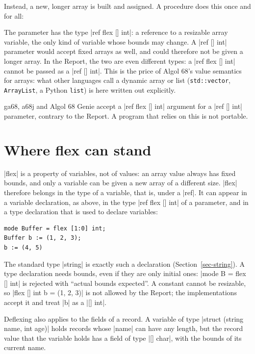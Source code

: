 
Instead, a new, longer array is built and assigned. A procedure does this
once and for all:


The parameter has the type \code|ref flex [] int|: a reference to a
resizable array variable, the only kind of variable whose bounds may
change. A \code|ref [] int| parameter would accept fixed arrays as well,
and could therefore not be given a longer array. In the Report, the two
are even different types: a \code|ref flex [] int| cannot be passed as a
\code|ref [] int|. This is the price of Algol 68's value semantics for
arrays: what other languages call a dynamic array or list
(\texttt{std::vector}, \texttt{ArrayList}, a Python \texttt{list}) is
here written out explicitly.

\begin{implnote}
ga68, a68j and Algol 68 Genie accept a \code|ref flex [] int| argument for
a \code|ref [] int| parameter, contrary to the Report. A program that
relies on this is not portable.
\end{implnote}

\section{Where \textbf{flex} can stand}\label{sec-flex-where}

\code|flex| is a property of variables, not of values: an array value
always has fixed bounds, and only a variable can be given a new array of
a different size. \code|flex| therefore belongs in the type of a
variable, that is, under a \code|ref|. It can appear in a variable
declaration, as above, in the type \code|ref flex [] int| of a
parameter, and in a type declaration that is used to declare variables:
\begin{lstlisting}
mode Buffer = flex [1:0] int;
Buffer b := (1, 2, 3);
b := (4, 5)
\end{lstlisting}
The standard type \code|string| is exactly such a declaration
(Section~\ref{sec-string}). A type declaration needs bounds, even if they
are only initial ones: \code|mode B = flex [] int| is rejected with
``actual bounds expected''. A constant cannot be resizable, so
\code|flex [] int b = (1, 2, 3)| is not allowed by the Report; the
implementations accept it and treat \code|b| as a \code|[] int|.

Deflexing also applies to the fields of a record. A variable of type
\code|struct (string name, int age)| holds records whose \code|name| can
have any length, but the record value that the variable holds has a
field of type \code|[] char|, with the bounds of its current name.

